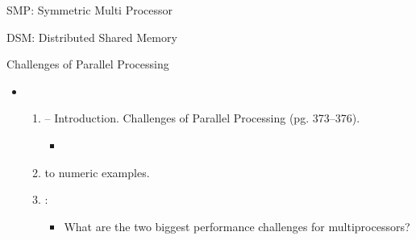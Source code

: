 \begin{frame}[t]{SMP: Symmetric Multi Processor}
\makebox[\textwidth][c]{}
\end{frame}

\begin{frame}[t]{DSM: Distributed Shared Memory}
\makebox[\textwidth][c]{}
\end{frame}

\begin{frame}[t]{Challenges of Parallel Processing}
\begin{itemize}
  \item {}
    \begin{enumerate}
      \item {}  -- Introduction.
            Challenges of Parallel Processing (pg. 373--376).
        \begin{itemize}
          \item \bibhennessy
        \end{itemize}

      \item {} to numeric examples.

      \item {}:
        \begin{itemize}
          \item What are the two biggest performance challenges for multiprocessors?
        \end{itemize}
    \end{enumerate}
\end{itemize}
\end{frame}
